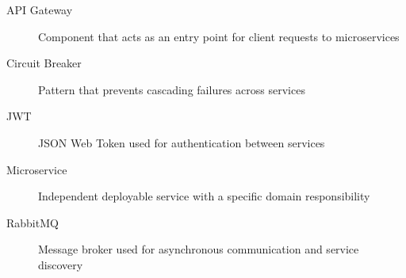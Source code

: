 \begin{terminology}
\begin{description}
    \item[API Gateway] Component that acts as an entry point for client requests to microservices
    \item[Circuit Breaker] Pattern that prevents cascading failures across services
    \item[JWT] JSON Web Token used for authentication between services
    \item[Microservice] Independent deployable service with a specific domain responsibility
    \item[RabbitMQ] Message broker used for asynchronous communication and service discovery
\end{description}
\end{terminology}
